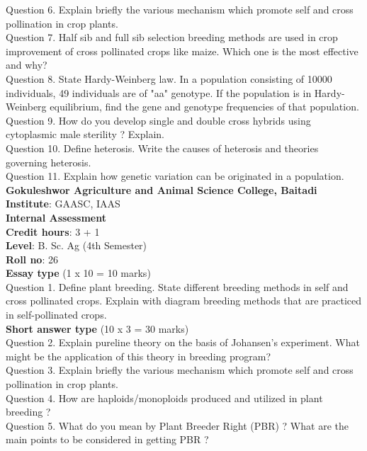 \documentclass[12pt]{article}\usepackage[]{graphicx}\usepackage[]{color}
\begin{document}
Question 6. Explain briefly the various mechanism which promote self and cross pollination in crop plants.\\
Question 7. Half sib and full sib selection breeding methods are used in crop improvement of cross pollinated crops like maize. Which one is the most effective and why?\\
Question 8. State Hardy-Weinberg law. In a population consisting of 10000 individuals, 49 individuals are of "aa" genotype. If the population is in Hardy-Weinberg equilibrium, find the gene and genotype frequencies of that population.\\
Question 9. How do you develop single and double cross hybrids using cytoplasmic male sterility ? Explain.\\
Question 10. Define heterosis. Write the causes of heterosis and theories governing heterosis.\\
Question 11. Explain how genetic variation can be originated in a population.\\
\clearpage 
{\centering \Large{\textbf{Gokuleshwor Agriculture and Animal Science College, Baitadi}} \\[0.25cm]
            \textbf{Institute}: GAASC, IAAS \\[0.2cm]
            \textbf{Internal Assessment} \\[0.2cm]} 
\textbf{Credit hours}: 3 + 1 \\ 
\textbf{Level}: B. Sc. Ag (4th Semester) \\
\textbf{Roll no}: 26 \\[0.5cm] 
\textbf{Essay type} (1 x 10 = 10 marks) \\
Question 1. Define plant breeding. State different breeding methods in self and cross pollinated crops. Explain with diagram breeding methods that are practiced in self-pollinated crops.\\
\textbf{Short answer type} (10 x 3 = 30 marks) \\
Question 2. Explain pureline theory on the basis of Johansen's experiment. What might be the application of this theory in breeding program?\\
Question 3. Explain briefly the various mechanism which promote self and cross pollination in crop plants.\\
Question 4. How are haploids/monoploids produced and utilized in plant breeding ?\\
Question 5. What do you mean by Plant Breeder Right (PBR) ? What are the main points to be considered in getting PBR ?\\
\end{document}
